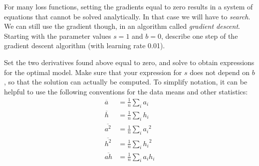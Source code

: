 \documentclass[11pt]{article}
\begin{document}
\qu For many loss functions, setting the gradients equal to zero results in a system of equations that cannot be solved analytically. In that case we will have to \emph{search}. We can still use the gradient though, in an algorithm called \emph{gradient descent}. Starting with the parameter values $s=1$ and $b=0$, describe one step of the gradient descent algorithm (with learning rate 0.01).

\qu Set the two derivatives found above equal to zero, and solve to obtain expressions for the optimal model. Make sure that your expression for $s$ does not depend on $b$, so that the solution can actually be computed. 
To simplify notation, it can be helpful to use the following conventions for the data means and other statistics:
\begin{align*}
\overline{a} &= \frac{1}{n}\sum_i a_i	\\
\overline{h} &= \frac{1}{n}\sum_i h_i	\\
\overline{a^2} &= \frac{1}{n}\sum_i {a_i}^2	\\
\overline{h^2} &= \frac{1}{n}\sum_i {h_i}^2	\\
\overline{ah} &= \frac{1}{n}\sum_i a_ih_i	\\
\end{align*}
\end{document}
